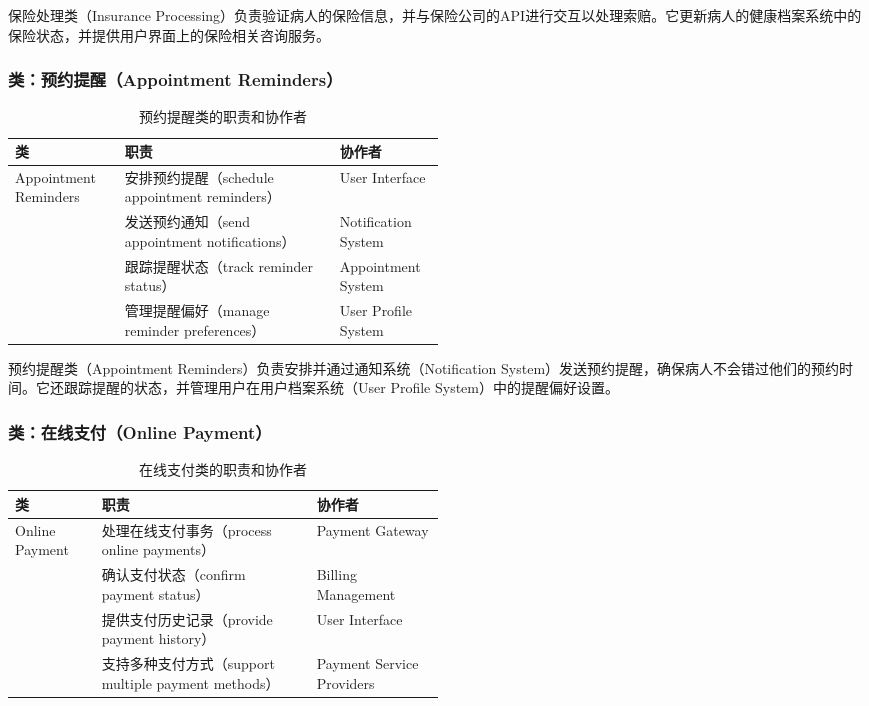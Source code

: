 保险处理类（Insurance Processing）负责验证病人的保险信息，并与保险公司的API进行交互以处理索赔。它更新病人的健康档案系统中的保险状态，并提供用户界面上的保险相关咨询服务。

\subsubsection{类：预约提醒（Appointment Reminders）}
\begin{table}[htbp]
	\centering
	\begin{tabular}{|l|p{0.5\linewidth}|l|}
		\hline
		\textbf{类} & \textbf{职责} & \textbf{协作者} \\
		\hline
		Appointment Reminders & 安排预约提醒（schedule appointment reminders） & User Interface \\
		& 发送预约通知（send appointment notifications） & Notification System \\
		& 跟踪提醒状态（track reminder status） & Appointment System \\
		& 管理提醒偏好（manage reminder preferences） & User Profile System \\
		\hline
	\end{tabular}
	\caption{预约提醒类的职责和协作者}
	\label{tab:appointment_reminders}
\end{table}

预约提醒类（Appointment Reminders）负责安排并通过通知系统（Notification System）发送预约提醒，确保病人不会错过他们的预约时间。它还跟踪提醒的状态，并管理用户在用户档案系统（User Profile System）中的提醒偏好设置。

\subsubsection{类：在线支付（Online Payment）}
\begin{table}[htbp]
	\centering
	\begin{tabular}{|l|p{0.5\linewidth}|l|}
		\hline
		\textbf{类} & \textbf{职责} & \textbf{协作者} \\
		\hline
		Online Payment & 处理在线支付事务（process online payments） & Payment Gateway \\
		& 确认支付状态（confirm payment status） & Billing Management \\
		& 提供支付历史记录（provide payment history） & User Interface \\
		& 支持多种支付方式（support multiple payment methods） & Payment Service Providers \\
		\hline
	\end{tabular}
	\caption{在线支付类的职责和协作者}
	\label{tab:online_payment}
\end{table}

